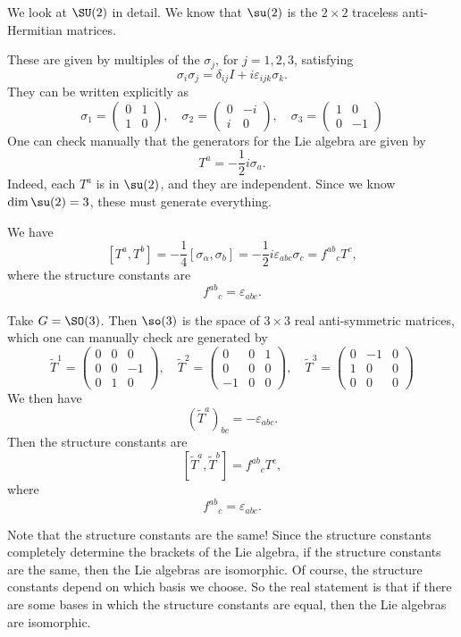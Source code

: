 \documentclass[a4paper]{article}
\begin{document}
\begin{eg}
  We look at $\SU(2)$ in detail. We know that $\su(2)$ is the $2 \times 2$ traceless anti-Hermitian matrices.

  These are given by multiples of the  $\sigma_j$, for $j = 1, 2, 3$, satisfying
  \[
    \sigma_i \sigma_j = \delta_{ij}I + i \varepsilon_{ijk} \sigma_k.
  \]
  They can be written explicitly as
  \[
    \sigma_1 =
    \begin{pmatrix}
      0 & 1\\
      1 & 0
    \end{pmatrix},\quad
    \sigma_2 =
    \begin{pmatrix}
      0 & -i\\
      i & 0
    \end{pmatrix},\quad
    \sigma_3 =
    \begin{pmatrix}
      1 & 0\\
      0 & -1
    \end{pmatrix}
  \]
  One can check manually that the generators for the Lie algebra are given by
  \[
    T^a = -\frac{1}{2} i \sigma_a.
  \]
  Indeed, each $T^a$ is in $\su(2)$, and they are independent. Since we know $\dim \su(2) = 3$, these must generate everything.

  We have
  \[
    [T^a, T^b] = -\frac{1}{4}[\sigma_\alpha, \sigma_b] = -\frac{1}{2} i \varepsilon_{abc} \sigma_c = f^{ab}\!_c T^c,
  \]
  where the structure constants are
  \[
    f^{ab}\!_c = \varepsilon_{abc}.
  \]
\end{eg}

\begin{eg}
  Take $G = \SO(3)$. Then $\so(3)$ is the space of $3 \times 3$ real anti-symmetric matrices, which one can manually check are generated by
  \[
    \tilde{T}^1 =
    \begin{pmatrix}
      0 & 0 & 0\\
      0 & 0 & -1\\
      0 & 1 & 0
    \end{pmatrix},\quad
    \tilde{T}^2 =
    \begin{pmatrix}
      0 & 0 & 1\\
      0 & 0 & 0\\
      -1 & 0 & 0
    \end{pmatrix},\quad
    \tilde{T}^3 =
    \begin{pmatrix}
      0 & -1 & 0\\
      1 & 0 & 0\\
      0 & 0 & 0
    \end{pmatrix}
  \]
  We then have
  \[
    (\tilde{T}^a)_{bc} = -\varepsilon_{abc}.
  \]
  Then the structure constants are
  \[
    [\tilde{T}^a, \tilde{T}^b] = f^{ab}\!_c T^c,
  \]
  where
  \[
    f^{ab}\!_{c} = \varepsilon_{abc}.
  \]
\end{eg}
Note that the structure constants are the same! Since the structure constants completely determine the brackets of the Lie algebra, if the structure constants are the same, then the Lie algebras are isomorphic. Of course, the structure constants depend on which basis we choose. So the real statement is that if there are some bases in which the structure constants are equal, then the Lie algebras are isomorphic.
\end{document}
